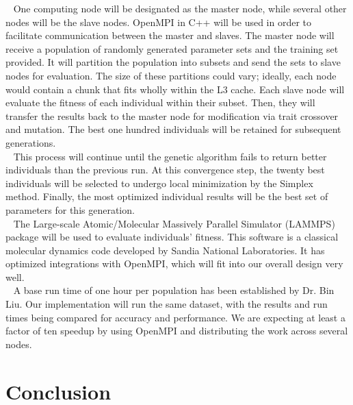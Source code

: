 \documentclass[letterpaper, 12pt]{article}
\begin{document}
\begin{flushleft}
~\newline
One computing node will be designated as the master node, while several other nodes will be the slave nodes.  OpenMPI in C++ will be used in order to facilitate communication between the master and slaves. The master node will receive a population of randomly generated parameter sets and the training set provided.  It will partition the population into subsets and send the sets to slave nodes for evaluation.  The size of these partitions could vary; ideally, each node would contain a chunk that fits wholly within the L3 cache. Each slave node will evaluate the fitness of each individual within their subset. Then, they will transfer the results back to the  master node for modification via trait crossover and mutation. The best one hundred individuals will be retained for subsequent generations.\\
~\newline 
This process will continue until the genetic algorithm fails to return better individuals than the previous run.  At this convergence step, the twenty best individuals will be selected to undergo local minimization by the Simplex method.  Finally, the most optimized individual results will be the best set of parameters for this generation. \\
~\newline
The Large-scale Atomic/Molecular Massively Parallel Simulator (LAMMPS) package will be used to evaluate individuals' fitness.  This software is a classical molecular dynamics code developed by Sandia National Laboratories.  It has optimized integrations with OpenMPI, which will fit into our overall design very well. \\
~\newline 
A base run time of one hour per population has been established by Dr. Bin Liu.  Our implementation will run the same dataset, with the results and run times being compared for accuracy and performance.  We are expecting at least a factor of ten speedup by using OpenMPI and distributing the work across several nodes.




\newpage
\section*{Conclusion}

\newpage
\printbibliography

\end{flushleft}
\end{document}
